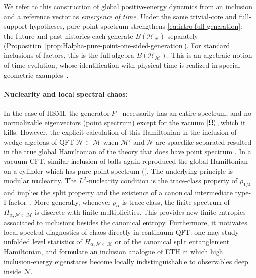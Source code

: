 \documentclass[a4paper,11pt]{article}
\theoremstyle{definition}
\newcommand{\mN}{\mathcal{N}}
\newcommand{\mH}{\mathcal{H}}
\newcommand{\mM}{\mathcal{M}}
\begin{document}
We refer to this construction of global positive-energy dynamics from an inclusion and a reference vector as \emph{emergence of time}. Under the same trivial-core and full-support hypotheses, pure point spectrum strengthens \eqref{eq:intro-full-generation}: the future and past histories each generate $B(\mH_{\mN})$ separately (Proposition~\ref{prop:Halpha-pure-point-one-sided-generation}). For standard inclusions of factors, this is the full algebra $B(\mH_{\mM})$. This is an algebraic notion of time evolution, whose identification with physical time is realized in special geometric examples~\cite{chen2026local}.


 
\paragraph{Nuclearity and local spectral chaos:} In the case of HSMI, the generator $P_-$ necessarily has an entire spectrum, and no normalizable eigenvectors (point spectrum) except for the vacuum $\ket{\Omega}$, which it kills. However, the explicit calculation of this Hamiltonian in the inclusion of wedge algebras of QFT $\mN\subset \mM$ when $\mM'$ and $\mN$ are spacelike separated resulted in the true global Hamiltonian of the theory that does have point spectrum \cite{chen2026local}. In a vacuum CFT, similar inclusion of balls again reproduced the global Hamiltonian on a cylinder which has pure point spectrum (\cite{chen2026local}). The underlying principle is modular nuclearity. The $L^2$-nuclearity condition is the trace-class property of $\rho_{1/4}$ and implies the split property and the existence of a canonical intermediate type-I factor~\cite{BuchholzDAntoniLongo1990,BDL2007}.  More generally, whenever $\rho_\alpha$ is trace class, the finite spectrum of $H_{\alpha,\mN\subset\mM}$ is discrete with finite multiplicities. This provides new finite entropies associated to inclusions besides the canonical entropy.
Furthermore, it motivates local spectral diagnostics of chaos directly in continuum QFT: one may study unfolded level statistics of $H_{\alpha,\mN\subset\mM}$ or of the canonical split entanglement Hamiltonian, and formulate an inclusion analogue of ETH in which high inclusion-energy eigenstates become locally indistinguishable to observables deep inside $\mN$.
\end{document}
